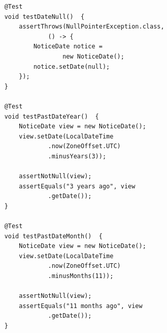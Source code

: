 \begin{listing}[!ht]
\begin{verbatim}
    @Test
    void testDateNull()  {
        assertThrows(NullPointerException.class,
                () -> {
            NoticeDate notice =
                    new NoticeDate();
            notice.setDate(null);
        });
    }

    @Test
    void testPastDateYear()  {
        NoticeDate view = new NoticeDate();
        view.setDate(LocalDateTime
                .now(ZoneOffset.UTC)
                .minusYears(3));

        assertNotNull(view);
        assertEquals("3 years ago", view
                .getDate());
    }

    @Test
    void testPastDateMonth()  {
        NoticeDate view = new NoticeDate();
        view.setDate(LocalDateTime
                .now(ZoneOffset.UTC)
                .minusMonths(11));

        assertNotNull(view);
        assertEquals("11 months ago", view
                .getDate());
    }

\end{verbatim}
\end{listing}


